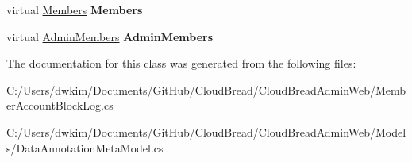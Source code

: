\begin{DoxyCompactItemize}
\item 
virtual \hyperlink{a00145}{Members} {\bfseries Members}\hypertarget{a00135_aa35c3e19953bbaea3eaca723359cc548}{}\label{a00135_aa35c3e19953bbaea3eaca723359cc548}

\item 
virtual \hyperlink{a00012}{Admin\+Members} {\bfseries Admin\+Members}\hypertarget{a00135_ae28c97d239cf795374eae061e9865f3e}{}\label{a00135_ae28c97d239cf795374eae061e9865f3e}

\end{DoxyCompactItemize}


The documentation for this class was generated from the following files\+:\begin{DoxyCompactItemize}
\item 
C\+:/\+Users/dwkim/\+Documents/\+Git\+Hub/\+Cloud\+Bread/\+Cloud\+Bread\+Admin\+Web/Member\+Account\+Block\+Log.\+cs\item 
C\+:/\+Users/dwkim/\+Documents/\+Git\+Hub/\+Cloud\+Bread/\+Cloud\+Bread\+Admin\+Web/\+Models/Data\+Annotation\+Meta\+Model.\+cs\end{DoxyCompactItemize}
